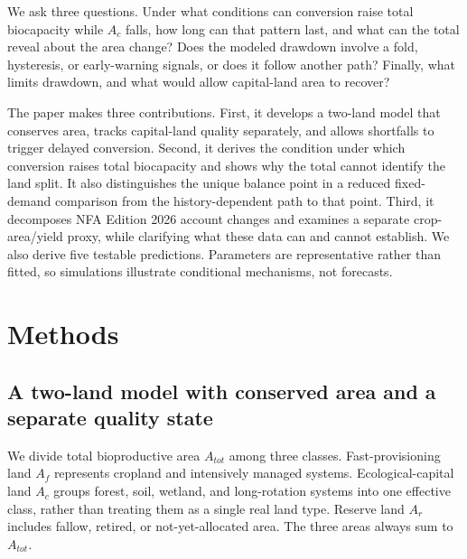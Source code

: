 \documentclass[preprint,12pt,authoryear]{elsarticle}
\begin{document}
We ask three questions. Under what conditions can conversion raise total biocapacity while $A_c$ falls, how long can that pattern last, and what can the total reveal about the area change? Does the modeled drawdown involve a fold, hysteresis, or early-warning signals, or does it follow another path? Finally, what limits drawdown, and what would allow capital-land area to recover?

The paper makes three contributions. First, it develops a two-land model that conserves area, tracks capital-land quality separately, and allows shortfalls to trigger delayed conversion. Second, it derives the condition under which conversion raises total biocapacity and shows why the total cannot identify the land split. It also distinguishes the unique balance point in a reduced fixed-demand comparison from the history-dependent path to that point. Third, it decomposes NFA Edition 2026 account changes and examines a separate crop-area/yield proxy, while clarifying what these data can and cannot establish. We also derive five testable predictions. Parameters are representative rather than fitted, so simulations illustrate conditional mechanisms, not forecasts.

\section{Methods}\label{sec:model}

\subsection{A two-land model with conserved area and a separate quality state}\label{sec:equations}

We divide total bioproductive area $A_{tot}$ among three classes. Fast-provisioning land $A_f$ represents cropland and intensively managed systems. Ecological-capital land $A_c$ groups forest, soil, wetland, and long-rotation systems into one effective class, rather than treating them as a single real land type. Reserve land $A_r$ includes fallow, retired, or not-yet-allocated area. The three areas always sum to $A_{tot}$.
\end{document}
